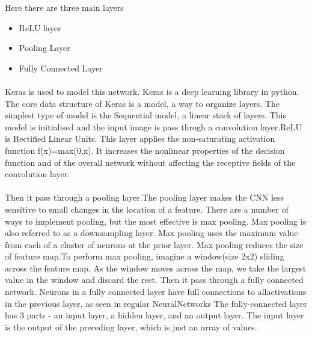 \documentclass[a4paper,12pt,oneside]{article}
\begin{document}
Here there are three main layers
\begin{itemize}
 
\item ReLU layer
\item Pooling Layer
\item Fully Connected Layer


\end{itemize}

\paragraph{}
Keras is used to model this network. Keras is a deep learning library in python. The core data structure of Keras is a model, a way to organize
layers. The simplest type of model is the Sequential model, a linear stack of layers. This model is initialised and the input image is pass throgh a convolution layer.ReLU is Rectified Linear Units. This layer applies the non-saturating activation function
f(x)=max(0,x). It increases the nonlinear properties of the decision function and of the overall network without affecting the receptive fields of the convolution layer.
\paragraph{}
Then it pass through a pooling layer.The pooling layer makes the CNN less sensitive to small changes
in the location of a feature. There are a number of ways to implement pooling, but the most effective is max pooling.
 Max pooling is also referred to as a downsampling layer.
Max pooling uses the maximum value from each of a cluster of
neurons at the prior layer. Max pooling reduces the size of feature map.To perform max pooling, imagine a window(size 2x2) sliding
across the feature map.
 As the window moves across the map, we take the largest value
in the window and discard the rest.
Then it pass through a fully connected network. Neurons in a fully connected layer have full connections to allactivations in the previous layer, as seen in regular NeuralNetworks
The fully-connected layer has 3 parts - an input layer, a hidden
layer, and an output layer. The input layer is the output of the preceding layer, which is just
an array of values.
\end{document}
